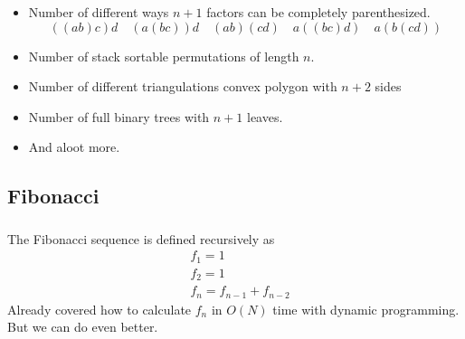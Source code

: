 \documentclass[10pt]{beamer}
\newcommand{\bi}{\begin{itemize}}
\newcommand{\ei}{\end{itemize}}
\def\hepta{\draw[foreground](A) -- (B) -- (C) -- (D) -- (E) -- (F) -- (G) -- cycle;}
\newcommand{\slice}[1]{%
    \hepta
    \draw[foreground] \foreach \x/\y in {#1} {(\x)--(\y)};
}
\begin{document}
\begin{frame}
  \frametitle{\insertsubsection}
  \bi
    \item Number of different ways $n+1$ factors can be completely parenthesized.
      \[
        ((ab)c)d\quad(a(bc))d\quad(ab)(cd)\quad a((bc)d)\quad a(b(cd))
      \]
    \item Number of stack sortable permutations of length $n$.
    \item Number of different triangulations convex polygon with $n+2$ sides
      \begin{figure}
      \end{figure}
    \item Number of full binary trees with $n+1$ leaves.
    \item And aloot more.
  \ei
\end{frame}

\subsection{Fibonacci}
\begin{frame}
  \frametitle{\insertsubsection}
  The Fibonacci sequence is defined recursively as
  \begin{align*}
    &f_1 = 1\\
    &f_2 = 1\\
    &f_n = f_{n-1} + f_{n-2}
  \end{align*}
  Already covered how to calculate $f_n$ in $O(N)$ time with dynamic programming.\\
  But we can do even better.
\end{frame}
\end{document}
